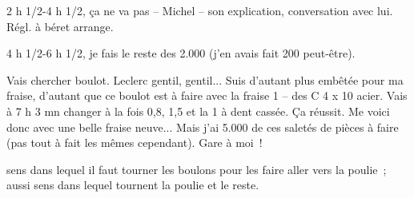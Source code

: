 \documentclass[french,twoside]{book} %
\begin{document}
2 h 1/2-4 h 1/2, ça ne va pas – Michel – son explication, conversation avec lui. Régl. à béret arrange.\par
4 h 1/2-6 h 1/2, je fais le reste des 2.000 (j'en avais fait 200 peut-être).\par
Vais chercher boulot. Leclerc gentil, gentil... Suis d'autant plus embêtée pour ma fraise, d'autant que ce boulot est à faire avec la fraise 1 – des C 4 x 10 acier. Vais à 7 h 3 mn changer à la fois 0,8, 1,5 et la 1 à dent cassée. Ça réussit. Me voici donc avec une belle fraise neuve... Mais j'ai 5.000 de ces saletés de pièces à faire (pas tout à fait les mêmes cependant). Gare à moi !\par
sens dans lequel il faut tourner les boulons pour les faire aller vers la poulie ; aussi sens dans lequel tournent la poulie et le reste.\par
\end{document}
